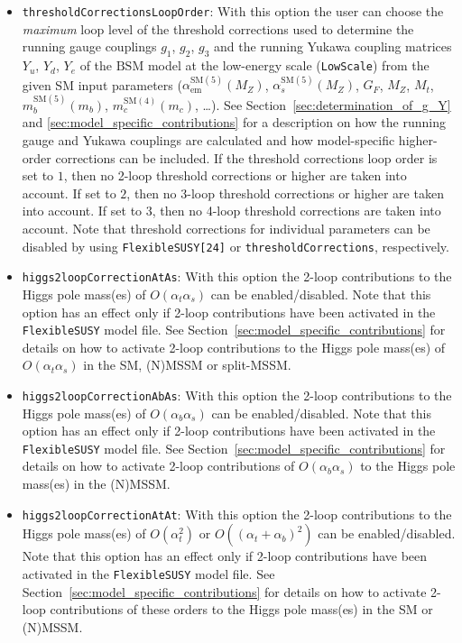 \documentclass[final,3p,11pt,pdflatex]{elsarticle}
\makeatletter
\newcommand{\fs}{\texttt{FlexibleSUSY}\@\xspace}
\newcommand{\code}[1]{\lstinline|#1|}  %
\newcommand{\SM}{\ensuremath{\text{SM}}\xspace}
\newcommand{\BSM}{\ensuremath{\text{BSM}}\xspace}
\newcommand{\secref}[1]{Section~\ref{#1}}
\def\at{\alpha_t}
\def\ab{\alpha_b}
\def\as{\alpha_s}
\def\aem{\alpha_{\text{em}}}
\makeatother
\begin{document}
\begin{itemize}
\item[\texttt{FlexibleSUSY[7]},]
  \texttt{thresholdCorrectionsLoopOrder}: With this option the user
  can choose the \emph{maximum} loop level of the threshold corrections
  used to determine the running gauge couplings $g_1$, $g_2$, $g_3$
  and the running Yukawa coupling matrices $Y_u$, $Y_d$, $Y_e$ of the
  \BSM model at the low-energy scale (\code{LowScale}) from the given
  SM input parameters ($\aem^{\SM(5)}(M_Z)$,
  $\as^{\SM(5)}(M_Z)$, $G_F$, $M_Z$, $M_t$, $m_b^{\SM(5)}(m_b)$,
  $m_c^{\SM(4)}(m_c)$, \ldots).  See \secref{sec:determination_of_g_Y}
  and \ref{sec:model_specific_contributions} for a description on how
  the running gauge and Yukawa couplings are calculated and how
  model-specific higher-order corrections can be included.  If the
  threshold corrections loop order is set to $1$, then no 2-loop
  threshold corrections or higher are taken into account.  If set to
  $2$, then no 3-loop threshold corrections or higher are taken into
  account.  If set to $3$, then no 4-loop threshold corrections are
  taken into account.
  Note that threshold corrections for individual parameters can be
  disabled by using \texttt{FlexibleSUSY[24]} or
  \texttt{thresholdCorrections}, respectively.

\item[\texttt{FlexibleSUSY[8]},] \texttt{higgs2loopCorrectionAtAs}:
  With this option the 2-loop contributions to the Higgs pole mass(es)
  of $O(\at\as)$ can be enabled/disabled.  Note that this
  option has an effect only if 2-loop contributions have been
  activated in the \fs model file.  See
  \secref{sec:model_specific_contributions} for details on how to
  activate 2-loop contributions to the Higgs pole mass(es) of
  $O(\at\as)$ in the SM, (N)MSSM or split-MSSM\@.

\item[\texttt{FlexibleSUSY[9]},] \texttt{higgs2loopCorrectionAbAs}:
  With this option the 2-loop contributions to the Higgs pole mass(es)
  of $O(\ab\as)$ can be enabled/disabled.  Note that this
  option has an effect only if 2-loop contributions have been
  activated in the \fs model file.  See
  \secref{sec:model_specific_contributions} for details on how to
  activate 2-loop contributions of $O(\ab\as)$ to the Higgs pole
  mass(es) in the (N)MSSM\@.

\item[\texttt{FlexibleSUSY[10]},] \texttt{higgs2loopCorrectionAtAt}:
  With this option the 2-loop contributions to the Higgs pole mass(es)
  of $O(\at^2)$ or $O((\at+\ab)^2)$ can be enabled/disabled.
  Note that this option has an effect only if 2-loop contributions
  have been activated in the \fs model file.  See
  \secref{sec:model_specific_contributions} for details on how to
  activate 2-loop contributions of these orders to the Higgs pole
  mass(es) in the SM or (N)MSSM\@.


\end{itemize}
\end{document}
